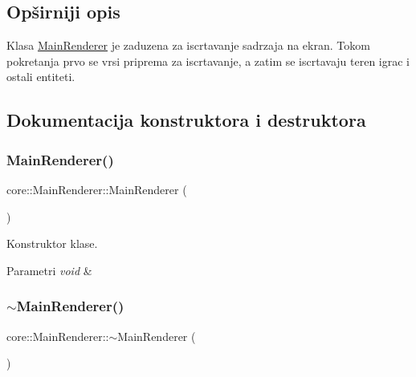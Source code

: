 \subsection{Opširniji opis}
Klasa \hyperlink{classcore_1_1MainRenderer}{Main\+Renderer} je zaduzena za iscrtavanje sadrzaja na ekran. Tokom pokretanja prvo se vrsi priprema za iscrtavanje, a zatim se iscrtavaju teren igrac i ostali entiteti. 

\subsection{Dokumentacija konstruktora i destruktora}
\mbox{\label{classcore_1_1MainRenderer_ab005c6e84882d475f9579f9c09b2329d}} 
\subsubsection{\texorpdfstring{Main\+Renderer()}{MainRenderer()}}
{\footnotesize\ttfamily core\+::\+Main\+Renderer\+::\+Main\+Renderer (\begin{DoxyParamCaption}{ }\end{DoxyParamCaption})}



Konstruktor klase. 


\begin{DoxyParams}{Parametri}
{\em void} & \\
\hline
\end{DoxyParams}
\mbox{\label{classcore_1_1MainRenderer_a1e5f39d2178a7c5738efa9be9bd486da}} 
\subsubsection{\texorpdfstring{$\sim$\+Main\+Renderer()}{~MainRenderer()}}
{\footnotesize\ttfamily core\+::\+Main\+Renderer\+::$\sim$\+Main\+Renderer (\begin{DoxyParamCaption}{ }\end{DoxyParamCaption})}



